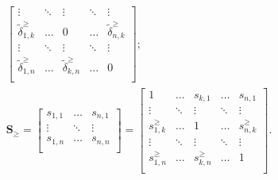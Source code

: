 \documentclass{elsarticle} %
\begin{document}
\begin{gather}
\begin{bmatrix}
        \vdots & \ddots & \vdots & \ddots & \vdots\\
        \tilde{\delta}_{1,k}^{\geq} & \hdots & 0 & \hdots & \tilde{\delta}_{n,k}^{\geq}\\
        \vdots & \ddots & \vdots & \ddots & \vdots\\
        \tilde{\delta}_{1,n}^{\geq} & \hdots & \tilde{\delta}_{k,n}^{\geq} & \hdots & 0\\
    \end{bmatrix}
    ;\\
    \textbf{S}_{\boldsymbol{\geq}} =
    \begin{bmatrix}
        s_{1,1} & \hdots & s_{n,1}\\
        \vdots & \ddots & \vdots\\
        s_{1,n} & \hdots & s_{n,n}\\
    \end{bmatrix} = 
    \begin{bmatrix}
        1 & \hdots & s_{k,1} & \hdots & s_{n,1}\\
        \vdots & \ddots & \vdots & \ddots & \vdots\\
        s_{1,k}^{\geq} & \hdots & 1 & \hdots & s_{n,k}^{\geq}\\
        \vdots & \ddots & \vdots & \ddots & \vdots\\
        s_{1,n}^{\geq} & \hdots & s_{k,n}^{\geq} & \hdots & 1\\
    \end{bmatrix}
    .
\end{gather}


\end{document}
